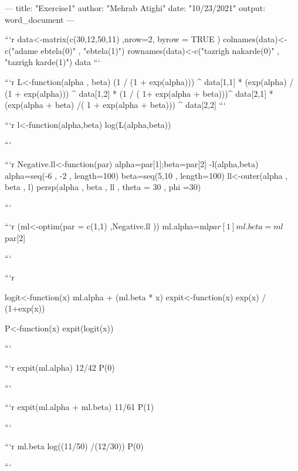 ---
title: "Exercise1"
author: "Mehrab Atighi"
date: "10/23/2021"
output: word_document
---



```{r}
data<-matrix(c(30,12,50,11) ,nrow=2, byrow = TRUE )
colnames(data)<-c("adame ebtela(0)" , "ebtela(1)")
rownames(data)<-c("tazrigh nakarde(0)" , "tazrigh karde(1)")
data
```


```{r}
L<-function(alpha , beta){
  (1 / (1 + exp(alpha))) ^ data[1,1] *
    (exp(alpha) / (1 + exp(alpha))) ^ data[1,2] *
    (1 / ( 1+ exp(alpha + beta)))^ data[2,1] *
    (exp(alpha + beta) /( 1 + exp(alpha + beta))) ^ data[2,2]
}
```

```{r}
l<-function(alpha,beta){
  log(L(alpha,beta))
}

```



```{r}
Negative.ll<-function(par){
  alpha=par[1];beta=par[2]
  -l(alpha,beta)
}
alpha=seq(-6 , -2 , length=100)
beta=seq(5,10 , length=100)
ll<-outer(alpha , beta , l) 
persp(alpha , beta , ll , theta = 30 , phi =30)

```


```{r}
(ml<-optim(par = c(1,1) ,Negative.ll ))
ml.alpha=ml$par[1]
ml.beta=ml$par[2]

```



```{r}

logit<-function(x){
  ml.alpha + (ml.beta * x)
}
expit<-function(x){
  exp(x) / (1+exp(x))
}

P<-function(x){
expit(logit(x))
  }

```

```{r}
expit(ml.alpha)
12/42
P(0)

```


```{r}
expit(ml.alpha + ml.beta)
11/61
P(1)

```

```{r}
ml.beta
log((11/50) /(12/30))
P(0)

```


